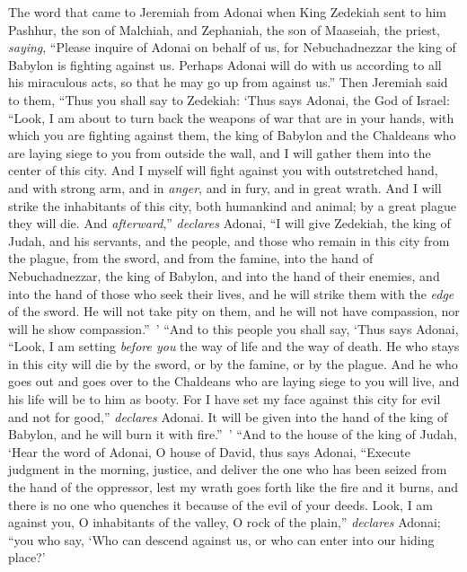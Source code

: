 \begin{biblechapter} %
 The word that came to Jeremiah from Adonai when King Zedekiah sent to him Pashhur, the son of Malchiah, and Zephaniah, the son of Maaseiah, the priest, \textit{saying},
\verse “Please inquire of Adonai on behalf of us, for Nebuchadnezzar the king of Babylon is fighting against us. Perhaps Adonai will do with us according to all his miraculous acts, so that he may go up from against us.”
\verse Then Jeremiah said to them, “Thus you shall say to Zedekiah:
\verse ‘Thus says Adonai, the God of Israel: “Look, I am about to turn back the weapons of war that are in your hands, with which you are fighting against them, the king of Babylon and the Chaldeans who are laying siege to you from outside the wall, and I will gather them into the center of this city.
\verse And I myself will fight against you with outstretched hand, and with strong arm, and in \textit{anger}, and in fury, and in great wrath.
\verse And I will strike the inhabitants of this city, both humankind and animal; by a great plague they will die.
\verse And \textit{afterward},” \textit{declares} Adonai, “I will give Zedekiah, the king of Judah, and his servants, and the people, and those who remain in this city from the plague, from the sword, and from the famine, into the hand of Nebuchadnezzar, the king of Babylon, and into the hand of their enemies, and into the hand of those who seek their lives, and he will strike them with the \textit{edge} of the sword. He will not take pity on them, and he will not have compassion, nor will he show compassion.” ’
 “And to this people you shall say, ‘Thus says Adonai, “Look, I am setting \textit{before you} the way of life and the way of death.
\verse He who stays in this city will die by the sword, or by the famine, or by the plague. And he who goes out and goes over to the Chaldeans who are laying siege to you will live, and his life will be to him as booty.
\verse For I have set my face against this city for evil and not for good,” \textit{declares} Adonai. It will be given into the hand of the king of Babylon, and he will burn it with fire.” ’
 “And to the house of the king of Judah, ‘Hear the word of Adonai,
\verse O house of David, thus says Adonai,
\verse “Execute judgment in the morning, justice, 
and deliver the one who has been seized 
from the hand of the oppressor, 
lest my wrath goes forth like the fire and it burns, 
and there is no one who quenches it 
because of the evil of your deeds.
\verse Look, I am against you, 
O inhabitants of the valley, 
O rock of the plain,” \textit{declares} Adonai; 
“you who say, ‘Who can descend against us, 
or who can enter into our hiding place?’
\end{biblechapter}

